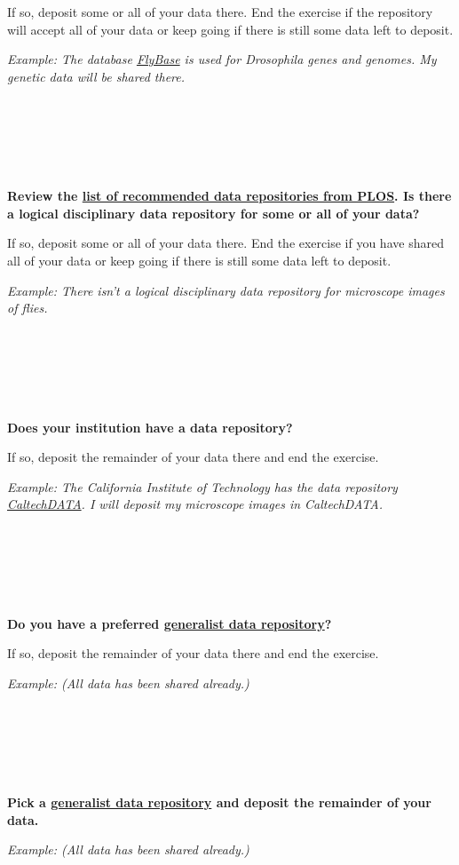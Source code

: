 \documentclass[
]{book}
\begin{document}
If so, deposit some or all of your data there. End the exercise if the repository will accept all of your data or keep going if there is still some data left to deposit.

\emph{Example: The database \href{http://flybase.org/}{FlyBase} is used for Drosophila genes and genomes. My genetic data will be shared there.}

~

~

~

\textbf{Review the \href{https://journals.plos.org/plosone/s/recommended-repositories}{list of recommended data repositories from PLOS}. Is there a logical disciplinary data repository for some or all of your data?}

If so, deposit some or all of your data there. End the exercise if you have shared all of your data or keep going if there is still some data left to deposit.

\emph{Example: There isn't a logical disciplinary data repository for microscope images of flies.}

~

~

~

\textbf{Does your institution have a data repository?}

If so, deposit the remainder of your data there and end the exercise.

\emph{Example: The California Institute of Technology has the data repository \href{https://data.caltech.edu/}{CaltechDATA}. I will deposit my microscope images in CaltechDATA.}

~

~

~

\textbf{Do you have a preferred \href{https://sharing.nih.gov/data-management-and-sharing-policy/sharing-scientific-data/generalist-repositories}{generalist data repository}?}

If so, deposit the remainder of your data there and end the exercise.

\emph{Example: (All data has been shared already.)}

~

~

~

\textbf{Pick a \href{https://sharing.nih.gov/data-management-and-sharing-policy/sharing-scientific-data/generalist-repositories}{generalist data repository} and deposit the remainder of your data.}

\emph{Example: (All data has been shared already.)}
\end{document}
